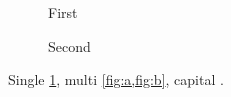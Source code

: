 \begin{figure}
\caption{First}
\label{fig:a}
\end{figure}
\begin{figure}
\caption{Second}
\label{fig:b}
\end{figure}
Single \cref{fig:a}, multi \cref{fig:a,fig:b}, capital .
